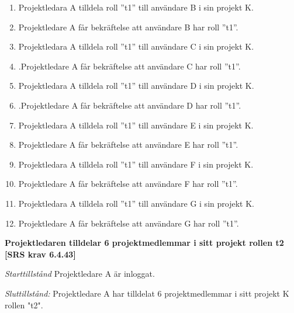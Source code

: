 \documentclass[a4paper]{article}
\begin{document}
\begin{FT}
\begin{enumerate}
\item Projektledara A tilldela roll ”t1” till användare B i sin projekt K. 
\item Projektledare A får bekräftelse att användare B har roll ”t1”.
\item Projektledara A tilldela roll ”t1” till användare C i sin projekt K. 
\item .Projektledare A får bekräftelse att användare C har roll ”t1”.
\item Projektledara A tilldela roll ”t1” till användare D i sin projekt K.
\item .Projektledare A får bekräftelse att användare D har roll ”t1”.
\item Projektledara A tilldela roll ”t1” till användare E i sin projekt K. 
\item Projektledare A får bekräftelse att användare E har roll ”t1”.
\item Projektledara A tilldela roll ”t1” till användare F i sin projekt K. 
\item Projektledare A får bekräftelse att användare F har roll ”t1”.
\item Projektledara A tilldela roll ”t1” till användare G i sin projekt K. 
\item Projektledare A får bekräftelse att användare G har roll ”t1”.
\end{enumerate}

\item %
\textbf{Projektledaren tilldelar 6 projektmedlemmar i sitt projekt rollen t2 [SRS krav 6.4.43]}

\emph{Starttillstånd} Projektledare A är inloggat.

\emph{Sluttillstånd:} Projektledare A  har tilldelat 6 projektmedlemmar i sitt projekt K rollen "t2".


\end{FT}
\end{document}
